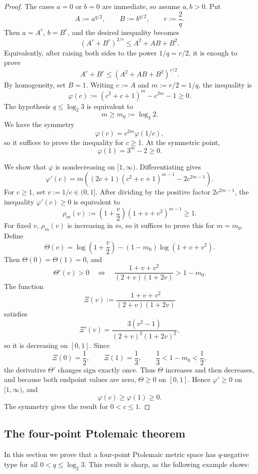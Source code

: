\documentclass[12pt]{amsart}
\theoremstyle{definition}
\newcommand{\1}{\mathbf{1}}
\begin{document}
\begin{proof}
The cases $a=0$ or $b=0$ are immediate, so assume $a,b>0$.
Put
\[
        A:=a^{q/2},\qquad B:=b^{q/2},\qquad r:=\frac{2}{q}.
\]
Then $a=A^r$, $b=B^r$, and the desired inequality becomes
\[
        (A^r+B^r)^{2/r}\le A^2+AB+B^2.
\]
Equivalently, after raising both sides to the power $1/q=r/2$, it is enough to
prove
\[
        A^r+B^r\le (A^2+AB+B^2)^{r/2}.
\]
By homogeneity, set $B=1$.  Writing $c:=A$ and $m:=r/2=1/q$, the inequality is
\[
        \varphi(c):=(c^2+c+1)^m-c^{2m}-1\ge0.
\]
The hypothesis $q\le\log_2 3$ is equivalent to
\[
        m\ge m_0:=\log_3 2.
\]
We have the symmetry
\[
        \varphi(c)=c^{2m}\varphi(1/c),
\]
so it suffices to prove the inequality for $c\ge1$.  At the symmetric point,
\[
        \varphi(1)=3^m-2\ge0.
\]

We show that $\varphi$ is nondecreasing on $[1,\infty)$.  Differentiating gives
\[
        \varphi'(c)
        =
        m\left((2c+1)(c^2+c+1)^{m-1}-2c^{2m-1}\right).
\]
For $c\ge1$, set $v:=1/c\in(0,1]$.  After dividing by the positive factor
$2c^{2m-1}$, the inequality $\varphi'(c)\ge0$ is equivalent to
\[
        \rho_m(v):=
        \left(1+\frac v2\right)(1+v+v^2)^{m-1}\ge1.
\]
For fixed $v$, $\rho_m(v)$ is increasing in $m$, so it suffices to prove this
for $m=m_0$.  Define
\[
        \Theta(v)
        =
        \log\left(1+\frac v2\right)
        -(1-m_0)\log(1+v+v^2).
\]
Then $\Theta(0)=\Theta(1)=0$, and
\[
        \Theta'(v)>0
        \quad\Longleftrightarrow\quad
        \frac{1+v+v^2}{(2+v)(1+2v)}>1-m_0.
\]
The function
\[
        \Xi(v):=\frac{1+v+v^2}{(2+v)(1+2v)}
\]
satisfies
\[
        \Xi'(v)=\frac{3(v^2-1)}{(2+v)^2(1+2v)^2},
\]
so it is decreasing on $[0,1]$.  Since
\[
        \Xi(0)=\frac12,\qquad \Xi(1)=\frac13,
        \qquad
        \frac13<1-m_0<\frac12,
\]
the derivative $\Theta'$ changes sign exactly once.  Thus $\Theta$ increases and
then decreases, and because both endpoint values are zero, $\Theta\ge0$ on
$[0,1]$.  Hence $\varphi'\ge0$ on $[1,\infty)$, and
\[
        \varphi(c)\ge\varphi(1)\ge0.
\]
The symmetry gives the result for $0<c\le1$.
\end{proof}

\subsection{The four-point Ptolemaic theorem}

In this section we prove that a four-point Ptolemaic metric space has $q$-negative type for all $0<q\le \log_2 3$.
This result is sharp, as the following example shows:
        
\end{document}
